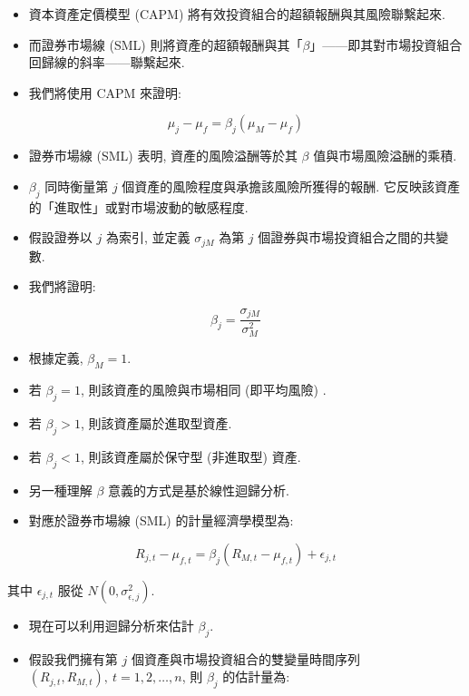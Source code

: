 \documentclass[letterpaper]{article}
\begin{document}
\begin{itemize}
	\item 資本資產定價模型 (CAPM) 將有效投資組合的超額報酬與其風險聯繫起來. 
	\item 而證券市場線 (SML) 則將資產的超額報酬與其「$\beta$」——即其對市場投資組合回歸線的斜率——聯繫起來. 
	\item 我們將使用 CAPM 來證明: 
\end{itemize}


$$
\mu_{j}-\mu_{f}=\beta_{j}\left (\mu_{M}-\mu_{f}\right) 
$$

\begin{itemize}
	\item 證券市場線 (SML) 表明, 資產的風險溢酬等於其 $\beta$ 值與市場風險溢酬的乘積. 
	\item $\beta_{j}$ 同時衡量第 $j$ 個資產的風險程度與承擔該風險所獲得的報酬. 它反映該資產的「進取性」或對市場波動的敏感程度. 
	\item 假設證券以 $j$ 為索引, 並定義 $\sigma_{j M}$ 為第 $j$ 個證券與市場投資組合之間的共變數. 
	\item 我們將證明: 
\end{itemize}


$$
\beta_{j}=\frac{\sigma_{j M}}{\sigma_{M}^{2}}
$$

\begin{itemize}
	\item 根據定義, $\beta_{M}=1$. 
	\item 若 $\beta_{j}=1$, 則該資產的風險與市場相同 (即平均風險) . 
	\item 若 $\beta_{j}>1$, 則該資產屬於進取型資產. 
	\item 若 $\beta_{j}<1$, 則該資產屬於保守型 (非進取型) 資產. 
	\item 另一種理解 $\beta$ 意義的方式是基於線性迴歸分析. 
	\item 對應於證券市場線 (SML) 的計量經濟學模型為: 
\end{itemize}


$$
R_{j, t}-\mu_{f, t}=\beta_{j}\left (R_{M, t}-\mu_{f, t}\right) +\epsilon_{j, t}
$$

其中 $\epsilon_{j, t}$ 服從 $N\left (0, \sigma_{\epsilon, j}^{2}\right) $. 

\begin{itemize}
	\item 現在可以利用迴歸分析來估計 $\beta_{j}$. 
	\item 假設我們擁有第 $j$ 個資產與市場投資組合的雙變量時間序列 $\left (R_{j, t}, R_{M, t}\right), \ t=1, 2, \ldots, n$, 則 $\beta_{j}$ 的估計量為: 
\end{itemize}
\end{document}
